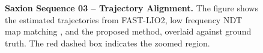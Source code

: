 \begin{figure}[H]
\begin{tikzpicture}
		
	\end{tikzpicture}
	
\caption[Saxion Sequence 03 – Trajectory Alignment with Zoomed Comparison]%
{\textbf{Saxion Sequence 03 – Trajectory Alignment.} 
	The figure shows the estimated trajectories from FAST-LIO2, low frequency NDT map matching , and the proposed method, overlaid against ground truth. The red dashed box indicates the zoomed region.
}
\label{fig:saxion-seq3-trajectory-zoom}
\end{figure}


%	
%	


